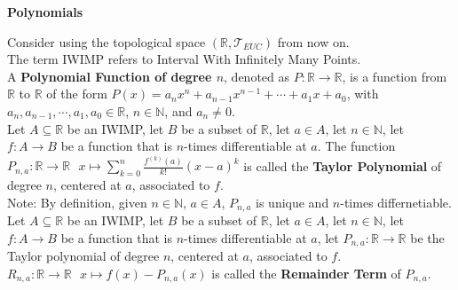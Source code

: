 \documentclass[11pt]{article}
\newcommand{\R}{\mathbb{R}}
\newcommand{\N}{\mathbb{N}}
\newcommand{\T}{\mathcal{T}}
\newcommand{\note}{\color{gray}Note: \color{black}}
\begin{document}
	\hfill\break
	\hfill\break
	\hfill\break
	\hfill\break
	\hfill\break

	\LARGE	\color{red}
		\noindent \textbf{Polynomials}\\
	\normalsize
	\color{black}
		
		\noindent \color{red} Consider using the topological space $(\R, \T_{EUC})$ from now on. \\ The term IWIMP refers to Interval With Infinitely Many Points. \color{black} \\
	
		
		\noindent A \textbf{Polynomial Function of degree $n$}, denoted as $P:\R \to \R$, is a function from $\R$ to $\R$ of the form $P(x)=a_n x^n + a_{n-1}x^{n-1} + \cdots + a_1 x + a_0$, with $a_n,a_{n-1},\cdots,a_1,a_0 \in \R$, $n \in \N$, and $a_n \neq 0$.\\
		
		\noindent Let $A \subseteq \R$ be an IWIMP, let $B$ be a subset of $\R$,  let $a \in A$, let $n \in \N$, let $f:A \to B$ be a function that is $n$-times differentiable at $a$. The function $P_{n,a}:\R \to \R \ \ \ x \mapsto \sum_{k=0}^n \frac{f^{(k)}(a)}{k!}(x-a)^k $ is called the \textbf{Taylor Polynomial} of degree $n$, centered at $a$, associated to $f$.\\
		\note By definition, given $n \in \N$, $a \in A$, $P_{n,a}$ is unique and $n$-times differnetiable.\\
		
		\noindent Let $A \subseteq \R$ be an IWIMP, let $B$ be a subset of $\R$,  let $a \in A$, let $n \in \N$, let $f:A \to B$ be a function that is $n$-times differentiable at $a$, let $P_{n,a}:\R \to \R$ be the Taylor polynomial of degree $n$, centered at $a$, associated to $f$. $R_{n,a}:\R \to \R \ \ \ x \mapsto f(x)-P_{n,a}(x)$ is called the \textbf{Remainder Term} of $P_{n,a}$.\\
		
	\clearpage	
	
	
	
	
\end{document}
